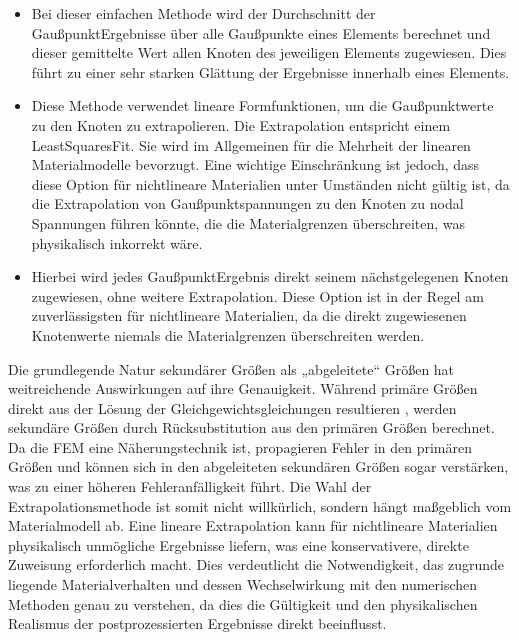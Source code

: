 \documentclass[letterpaper,10pt,german]{jupyterBook}
\begin{document}
\begin{itemize}
\item {} 
\sphinxAtStartPar
{} Bei dieser einfachen Methode wird der Durchschnitt der Gaußpunkt\sphinxhyphen{}Ergebnisse über alle Gaußpunkte eines Elements berechnet und dieser gemittelte Wert allen Knoten des jeweiligen Elements zugewiesen. Dies führt zu einer sehr starken Glättung der Ergebnisse innerhalb eines Elements.

\item {} 
\sphinxAtStartPar
{} Diese Methode verwendet lineare Formfunktionen, um die Gaußpunktwerte zu den Knoten zu extrapolieren. Die Extrapolation entspricht einem Least\sphinxhyphen{}Squares\sphinxhyphen{}Fit. Sie wird im Allgemeinen für die Mehrheit der linearen Materialmodelle bevorzugt. Eine wichtige Einschränkung ist jedoch, dass diese Option für nichtlineare Materialien unter Umständen nicht gültig ist, da die Extrapolation von Gaußpunktspannungen zu den Knoten zu nodal Spannungen führen könnte, die die Materialgrenzen überschreiten, was physikalisch inkorrekt wäre.

\item {} 
\sphinxAtStartPar
{} Hierbei wird jedes Gaußpunkt\sphinxhyphen{}Ergebnis direkt seinem nächstgelegenen Knoten zugewiesen, ohne weitere Extrapolation. Diese Option ist in der Regel am zuverlässigsten für nichtlineare Materialien, da die direkt zugewiesenen Knotenwerte niemals die Materialgrenzen überschreiten werden.

\end{itemize}

\sphinxAtStartPar
Die grundlegende Natur sekundärer Größen als „abgeleitete“ Größen hat weitreichende Auswirkungen auf ihre Genauigkeit. Während primäre Größen direkt aus der Lösung der Gleichgewichtsgleichungen resultieren , werden sekundäre Größen durch Rücksubstitution aus den primären Größen berechnet. Da die FEM eine Näherungstechnik ist, propagieren Fehler in den primären Größen und können sich in den abgeleiteten sekundären Größen sogar verstärken, was zu einer höheren Fehleranfälligkeit führt. Die Wahl der Extrapolationsmethode ist somit nicht willkürlich, sondern hängt maßgeblich vom Materialmodell ab. Eine lineare Extrapolation kann für nichtlineare Materialien physikalisch unmögliche Ergebnisse liefern, was eine konservativere, direkte Zuweisung erforderlich macht. Dies verdeutlicht die Notwendigkeit, das zugrunde liegende Materialverhalten und dessen Wechselwirkung mit den numerischen Methoden genau zu verstehen, da dies die Gültigkeit und den physikalischen Realismus der postprozessierten Ergebnisse direkt beeinflusst.
\end{document}
